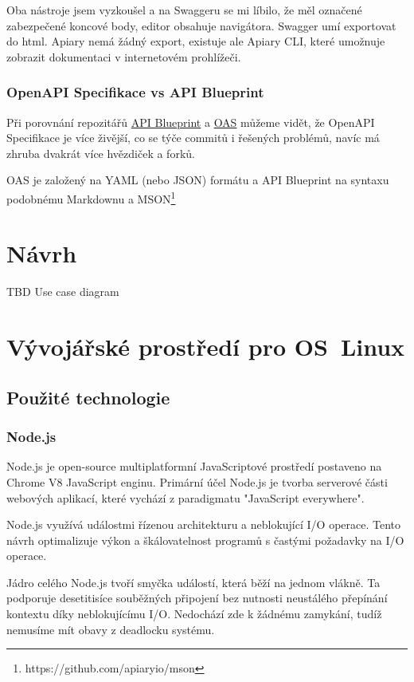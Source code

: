 \documentclass[thesis=B,czech]{FITthesis}[2012/06/26]
\begin{document}
        
        Oba nástroje jsem vyzkoušel a na Swaggeru se mi líbilo, že měl označené zabezpečené koncové body, editor obsahuje navigátora. Swagger umí exportovat do html. Apiary nemá žádný export, existuje ale Apiary CLI, které umožnuje zobrazit dokumentaci v internetovém prohlížeči.
        
        
        \subsection{OpenAPI Specifikace vs API Blueprint}
            Při porovnání repozitářů \href{https://github.com/apiaryio/api-blueprint/graphs/contributors}{API Blueprint} a \href{https://github.com/OAI/OpenAPI-Specification/graphs/contributors}{OAS} můžeme vidět, že OpenAPI Specifikace je více živější, co se týče commitů i řešených problémů, navíc má zhruba dvakrát více hvězdiček a forků.
            
            OAS je založený na YAML (nebo JSON) formátu a API Blueprint na syntaxu podobnému Markdownu a MSON\footnote{https://github.com/apiaryio/mson}

\chapter{Návrh}

    TBD Use case diagram

\chapter{Vývojářské prostředí pro OS~Linux}
    
    \section{Použité technologie}
        \subsection{Node.js}
            Node.js je open-source multiplatformní JavaScriptové prostředí postaveno na Chrome V8 JavaScript enginu. Primární účel Node.js je tvorba serverové části webových aplikací, které vychází z paradigmatu "JavaScript everywhere".
            
            Node.js využívá událostmi řízenou architekturu a neblokující I/O operace. Tento návrh optimalizuje výkon a škálovatelnost programů s častými požadavky na I/O operace.
            
            Jádro celého Node.js tvoří smyčka událostí, která běží na jednom vlákně. Ta podporuje desetitisíce souběžných připojení bez nutnosti neustálého přepínání kontextu díky neblokujícímu I/O. Nedochází zde k žádnému zamykání, tudíž nemusíme mít obavy z deadlocku systému.
\end{document}
